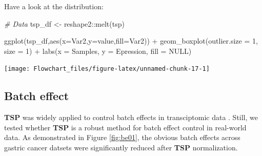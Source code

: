 \documentclass[
  12pt,
]{book}
\newenvironment{Shaded}{\begin{snugshade}}{\end{snugshade}}
\newcommand{\AttributeTok}[1]{\textcolor[rgb]{0.77,0.63,0.00}{#1}}
\newcommand{\CommentTok}[1]{\textcolor[rgb]{0.56,0.35,0.01}{\textit{#1}}}
\newcommand{\ConstantTok}[1]{\textcolor[rgb]{0.00,0.00,0.00}{#1}}
\newcommand{\DecValTok}[1]{\textcolor[rgb]{0.00,0.00,0.81}{#1}}
\newcommand{\FunctionTok}[1]{\textcolor[rgb]{0.00,0.00,0.00}{#1}}
\newcommand{\NormalTok}[1]{#1}
\newcommand{\OtherTok}[1]{\textcolor[rgb]{0.56,0.35,0.01}{#1}}
\newcommand{\SpecialCharTok}[1]{\textcolor[rgb]{0.00,0.00,0.00}{#1}}
\newcommand{\StringTok}[1]{\textcolor[rgb]{0.31,0.60,0.02}{#1}}
\begin{document}
Have a look at the distribution:

\begin{Shaded}
\begin{Highlighting}[]

\CommentTok{\# Data}
\NormalTok{tsp\_df }\OtherTok{\textless{}{-}}\NormalTok{ reshape2}\SpecialCharTok{::}\FunctionTok{melt}\NormalTok{(tsp)}

\FunctionTok{ggplot}\NormalTok{(tsp\_df,}\FunctionTok{aes}\NormalTok{(}\AttributeTok{x=}\NormalTok{Var2,}\AttributeTok{y=}\NormalTok{value,}\AttributeTok{fill=}\NormalTok{Var2)) }\SpecialCharTok{+} 
      \FunctionTok{geom\_boxplot}\NormalTok{(}\AttributeTok{outlier.size =} \DecValTok{1}\NormalTok{, }\AttributeTok{size =} \DecValTok{1}\NormalTok{) }\SpecialCharTok{+} 
      \FunctionTok{labs}\NormalTok{(}\AttributeTok{x =} \StringTok{\textquotesingle{}Samples\textquotesingle{}}\NormalTok{,}
           \AttributeTok{y =} \StringTok{\textquotesingle{}Epression\textquotesingle{}}\NormalTok{,}
           \AttributeTok{fill =} \ConstantTok{NULL}\NormalTok{) }
\end{Highlighting}
\end{Shaded}

\begin{center}\texttt{[image: Flowchart\_files/figure-latex/unnamed-chunk-17-1]} \end{center}

\hypertarget{batch-effect}{%
\subsection{Batch effect}\label{batch-effect}}

\textbf{TSP} was widely applied to control batch effects in transciptomic data \citep{RN369, RN367, RN368, RN364, RN363, RN362, RN366, RN365}. Still, we tested whether \textbf{TSP} is a robust method for batch effect control in real-world data. As demonstrated in Figure \ref{fig:be01}, the obvious batch effects across gastric cancer datsets were significantly reduced after \textbf{TSP} normalization.
\end{document}
